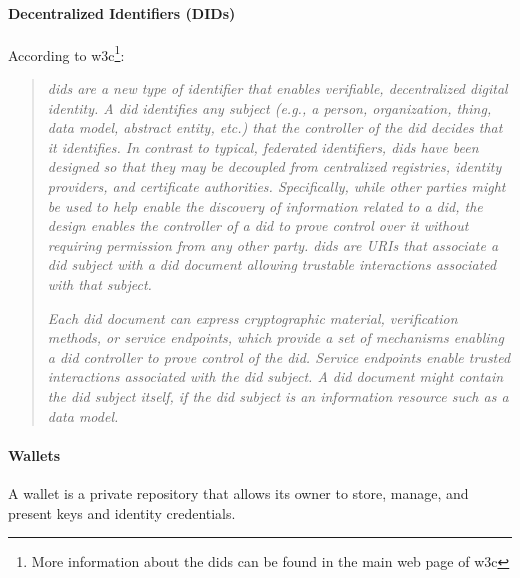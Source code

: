 \paragraph{Decentralized Identifiers (DIDs)}
According to \acrshort{w3c}\cite{w3c-did}\footnote{More information about the \acrshort{did}s can be found in the main web page of \acrshort{w3c}\cite{w3c-did}}:
\begin{quote}
    \textit{\acrfull{did}s are a new type of identifier that enables verifiable, decentralized digital identity. A \acrshort{did} identifies any subject (e.g., a person, organization, thing, data model, abstract entity, etc.) that the controller of the \acrshort{did} decides that it identifies. In contrast to typical, federated identifiers, \acrshort{did}s have been designed so that they may be decoupled from centralized registries, identity providers, and certificate authorities. Specifically, while other parties might be used to help enable the discovery of information related to a \acrshort{did}, the design enables the controller of a \acrshort{did} to prove control over it without requiring permission from any other party. \acrshort{did}s are URIs that associate a \acrshort{did} subject with a \acrshort{did} document allowing trustable interactions associated with that subject.}

    \textit{Each \acrshort{did} document can express cryptographic material, verification methods, or service endpoints, which provide a set of mechanisms enabling a \acrshort{did} controller to prove control of the \acrshort{did}. Service endpoints enable trusted interactions associated with the \acrshort{did} subject. A \acrshort{did} document might contain the \acrshort{did} subject itself, if the \acrshort{did} subject is an information resource such as a data model.}
\end{quote}

\paragraph{Wallets}
A wallet\cite{ssi-wallets} is a private repository that allows its owner to store, manage, and present keys and identity credentials.\\

